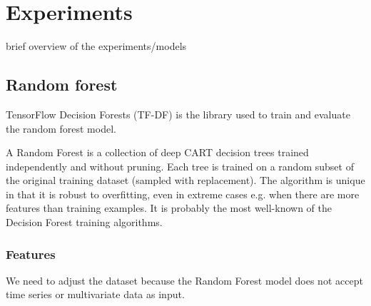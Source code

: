 \section{Experiments}
brief overview of the experiments/models

\subsection{Random forest}
TensorFlow Decision Forests (TF-DF) is the library used to train and evaluate the random forest model.

A Random Forest is a collection of deep CART decision trees trained independently and without pruning.
Each tree is trained on a random subset of the original training dataset (sampled with replacement).
The algorithm is unique in that it is robust to overfitting, even in extreme cases e.g. when there are more features than training examples.
It is probably the most well-known of the Decision Forest training algorithms.

\subsubsection{Features}
We need to adjust the dataset because the Random Forest model does not accept time series or multivariate data as input.

